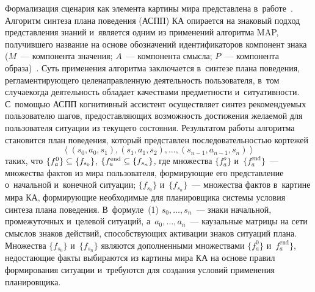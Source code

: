 \begin{multicols}{2}
  Формализация сценария как элемента картины мира представлена 
в~работе~\cite{13-sm}. Алгоритм синтеза плана поведения (АСПП) 
КА опирается на знаковый подход пред\-став\-ле\-ния 
знаний и~является одним из применений алгоритма MAP, получившего 
название на основе обозначений идентификаторов компонент знака ($M$~--- 
компонента значения; $A$~--- компонента смыс\-ла; $P$~--- компонента 
образа)~\cite{14-sm}. Суть применения алгоритма за\-клю\-ча\-ет\-ся в~синтезе плана 
поведения, рег\-ла\-мен\-ти\-ру\-юще\-го це\-ле\-на\-прав\-лен\-ную де\-я\-тель\-ность пользователя, 
в~том случае\linebreak когда деятельность обладает качествами пред\-мет\-ности 
и~си\-ту\-а\-тив\-ности. С~по\-мощью АСПП когнитивный ассистент осуществляет синтез рекомендуемых 
пользователю шагов, пред\-остав\-ля\-ющих \mbox{воз\-мож\-ность} достижения же\-ла\-емой для 
пользователя ситуации из текущего со\-сто\-яния. Результатом работы алгоритма 
становится план поведения, который пред\-став\-лен по\-сле\-до\-ва\-тель\-ностью 
кортежей
  \begin{equation}
  \left\langle \left( s_0, a_0,s_1\right), \left( s_1, a_1, s_2\right),\ldots , \left( s_{n-1}, 
a_{n-1}, s_n\right)\right\rangle
  \label{e1-sm}
  \end{equation}
таких, что $\{f_a^0\} \hm\subseteq \{ f_{s_0}\}$, $\{f_a^{\mathrm{end}}\hm\subseteq 
\{f_{s_n}\}$, где множества $\{f_a^o\}$ и~$\{f_a^{\mathrm{end}}\}$~--- множества фак\-тов 
из мира пользователя, формирующие его пред\-став\-ле\-ние о~начальной 
и~конечной ситуации;  $\{f_{s_0}\}$ и~$\{f_{s_n}\}$~--- множества фак\-тов 
в~картине мира КА, формирующие необходимые для планировщика системы 
условия синтеза плана поведения. В~формуле~(1) $s_0,\ldots , s_n$~--- знаки 
начальной, промежуточных и~целевой ситуаций, а~$a_0,\ldots , a_n$~--- 
каузальные матрицы на сети смыс\-лов знаков действий, спо\-соб\-ст\-ву\-ющих 
активации знаков ситуаций плана. Множества $\{f_{s_0}\}$ и~$\{f_{s_n}\}$ 
являются дополненными множествами $\{f_a^0\}$ и~$f_a^{\mathrm{end}}\}$, недостающие 
факты выбираются из картины мира КА на основе правил формирования 
ситуации и~требуются для создания условий применения планировщика.
  

\end{multicols}
